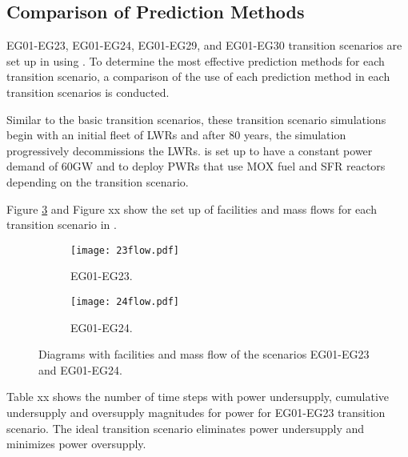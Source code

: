 \subsection{Comparison of Prediction Methods}
EG01-EG23, EG01-EG24, EG01-EG29, and EG01-EG30 transition scenarios
are set up in \Cyclus using \deploy. 
To determine the most effective \deploy prediction methods for 
each transition scenario, a
comparison of the use of each prediction method in each 
transition scenarios is conducted. 

Similar to the basic transition scenarios, these transition scenario 
simulations begin with an initial fleet of \gls{LWR}s and after 
80 years, the simulation progressively decommissions the \gls{LWR}s. 
\Deploy is set up to have a constant power demand of 60GW and to 
deploy \gls{PWR}s that use \gls{MOX} fuel and \gls{SFR} reactors 
depending on the transition scenario. 

Figure \ref{fig:eg2324} and Figure xx %
show the set up of facilities and mass flows for 
each transition scenario in \Cyclus. 

\begin{figure}[]
	\centering
	\begin{subfigure}[t]{\textwidth}
		\centering
		\texttt{[image: 23flow.pdf]} 
		\caption{EG01-EG23.}
		\label{fig:23flow}
	\end{subfigure}
	\vspace{1cm}
	\begin{subfigure}[t]{\textwidth}
		\centering
		\texttt{[image: 24flow.pdf]} 
		\caption{EG01-EG24.}
		\label{fig:24flow}
	\end{subfigure}
	\hfill
	\caption{Diagrams with facilities and mass flow of the scenarios EG01-EG23 and EG01-EG24.}
	\label{fig:eg2324}
\end{figure}

Table xx shows the number of time steps with power undersupply, 
cumulative undersupply and oversupply magnitudes for power for 
EG01-EG23 transition scenario. 
The ideal transition scenario eliminates power undersupply and 
minimizes power oversupply. 


